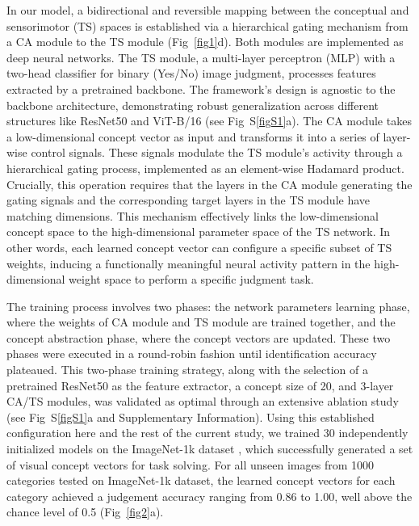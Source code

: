 \documentclass[pdflatex,sn-mathphys-num,lineno]{sn-jnl}%
\begin{document}
\begin{CJK}{UTF8}{gbsn}
In our model, a bidirectional and reversible mapping between the conceptual and sensorimotor (TS) spaces is established via a hierarchical gating mechanism from a CA module to the TS module (Fig~\ref{fig1}d). Both modules are implemented as deep neural networks. The TS module, a multi-layer perceptron (MLP) with a two-head classifier for binary (Yes/No) image judgment, processes features extracted by a pretrained backbone. The framework's design is agnostic to the backbone architecture, demonstrating robust generalization across different structures like ResNet50 \cite{he_deep_2016} and ViT-B/16 \cite{dosovitskiy_image_2021} (see Fig~S\ref{figS1}a). The CA module takes a low-dimensional concept vector as input and transforms it into a series of layer-wise control signals. These signals modulate the TS module's activity through a hierarchical gating process, implemented as an element-wise Hadamard product. Crucially, this operation requires that the layers in the CA module generating the gating signals and the corresponding target layers in the TS module have matching dimensions. This mechanism effectively links the low-dimensional concept space to the high-dimensional parameter space of the TS network. In other words, each learned concept vector can configure a specific subset of TS weights, inducing a functionally meaningful neural activity pattern in the high-dimensional weight space to perform a specific judgment task.

The training process involves two phases: the network parameters learning phase, where the weights of CA module and TS module are trained together, and the concept abstraction phase, where the concept vectors are updated. These two phases were executed in a round-robin fashion until identification accuracy plateaued. This two-phase training strategy, along with the selection of a pretrained ResNet50 as the feature extractor, a concept size of 20, and 3-layer CA/TS modules, was validated as optimal through an extensive ablation study (see Fig~S\ref{figS1}a and Supplementary Information). Using this established configuration here and the rest of the current study, we trained 30 independently initialized models on the ImageNet-1k dataset \cite{deng_imagenet_2009}, which successfully generated a set of visual concept vectors for task solving. For all unseen images from 1000 categories tested on ImageNet-1k dataset, the learned concept vectors for each category achieved a judgement accuracy ranging from 0.86 to 1.00, well above the chance level of 0.5 (Fig~\ref{fig2}a).


\end{CJK}
\end{document}
